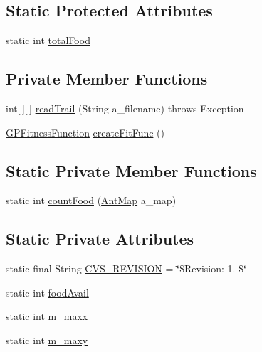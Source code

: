 \subsection*{Static Protected Attributes}
\begin{DoxyCompactItemize}
\item 
static int \hyperlink{classexamples_1_1gp_1_1anttrail_1_1_ant_trail_problem_a12541a40eb03cb354f1574947d6f597e}{total\-Food}
\end{DoxyCompactItemize}
\subsection*{Private Member Functions}
\begin{DoxyCompactItemize}
\item 
int\mbox{[}$\,$\mbox{]}\mbox{[}$\,$\mbox{]} \hyperlink{classexamples_1_1gp_1_1anttrail_1_1_ant_trail_problem_ac59269a86b6b2c30cd5976c83e6cb4ca}{read\-Trail} (String a\-\_\-filename)  throws Exception 
\item 
\hyperlink{classorg_1_1jgap_1_1gp_1_1_g_p_fitness_function}{G\-P\-Fitness\-Function} \hyperlink{classexamples_1_1gp_1_1anttrail_1_1_ant_trail_problem_a09cfa551acca35480759c65bdca32366}{create\-Fit\-Func} ()
\end{DoxyCompactItemize}
\subsection*{Static Private Member Functions}
\begin{DoxyCompactItemize}
\item 
static int \hyperlink{classexamples_1_1gp_1_1anttrail_1_1_ant_trail_problem_aeff2076aab21d638949d1109bfcd0a3e}{count\-Food} (\hyperlink{classexamples_1_1gp_1_1anttrail_1_1_ant_map}{Ant\-Map} a\-\_\-map)
\end{DoxyCompactItemize}
\subsection*{Static Private Attributes}
\begin{DoxyCompactItemize}
\item 
static final String \hyperlink{classexamples_1_1gp_1_1anttrail_1_1_ant_trail_problem_aa05111e6a1c8134ae5dffe54a45b9e54}{C\-V\-S\-\_\-\-R\-E\-V\-I\-S\-I\-O\-N} = \char`\"{}\$Revision\-: 1. \$\char`\"{}
\item 
static int \hyperlink{classexamples_1_1gp_1_1anttrail_1_1_ant_trail_problem_a0c198af0aeb47b118c553a4f0c3304a9}{food\-Avail}
\item 
static int \hyperlink{classexamples_1_1gp_1_1anttrail_1_1_ant_trail_problem_a1456ecc3548fba0c0843f20a0abbb107}{m\-\_\-maxx}
\item 
static int \hyperlink{classexamples_1_1gp_1_1anttrail_1_1_ant_trail_problem_a0c1ac1295239c03087ee11ca6bcbd9f9}{m\-\_\-maxy}
\end{DoxyCompactItemize}


